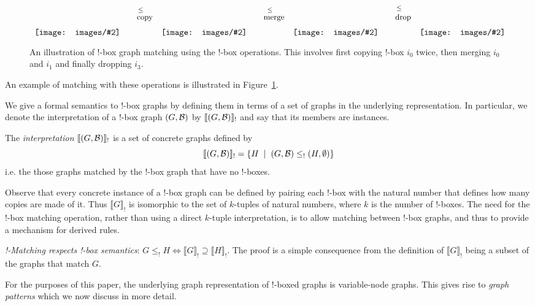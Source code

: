 \documentclass[runningheads]{llncs}
\newcommand{\binterp}[1]{\llbracket #1 \rrbracket_!}
\newcommand{\inlinegraphic}[2]{
  \dimendef\grafheight=255\dimendef\grafvshift=254
  \grafheight=#1
  \grafvshift=-0.5\grafheight
  \advance\grafvshift by 0.5ex
  \raisebox{\grafvshift}{\texttt{[image: images/\#2]}\xspace}
}
\begin{document}
\begin{figure}[t]
$$\begin{array}{ccccccc}
\inlinegraphic{4em}{bbox-ex1} &  
\stackrel{\leq}{\stackrel{\ }{\mbox{\small{copy}}}} 
& \inlinegraphic{4em}{bbox-ex2}  & 
\stackrel{\leq}{\stackrel{\ }{\mbox{\small{merge}}}} 
& \inlinegraphic{4em}{bbox-ex3}  & 
\stackrel{\leq}{\stackrel{\ }{\mbox{\small{drop}}}} 
& \inlinegraphic{4em}{bbox-ex4}
\end{array}$$ 
\label{fig:bang-box-example}\caption{An illustration of !-box graph
  matching using the !-box operations. This involves first copying
  !-box $i_0$ twice, then merging $i_0$ and $i_1$ and finally dropping
  $i_3$.}
\end{figure}
 
An example of matching with these operations is illustrated in
Figure~\ref{fig:bang-box-example}.

We give a formal semantics to !-box graphs by defining them in terms
of a set of graphs in the underlying representation. In particular, we
denote the interpretation of a !-box graph $(G,{\cal B})$ by
$\binterp{(G,{\cal B})}$ and say that its members are instances.

\begin{definition}
  The \emph{interpretation} $\binterp{(G,{\cal B})}$ is a
  set of concrete graphs defined by
  \[
  \binterp{(G,{\cal B})} = \{ H \;\;|\;\; (G,{\cal B}) \leq_! (H,\emptyset) \}
  \]
  i.e. the those graphs matched by the !-box graph that have no
  !-boxes.
\end{definition}

Observe that every concrete instance of a !-box graph can be defined
by pairing each !-box with the natural number that defines how many
copies are made of it. Thus $\binterp{G}$ is isomorphic to the set of
$k$-tuples of natural numbers, where $k$ is the number of !-boxes.
The need for the !-box matching operation, rather than using a direct
$k$-tuple interpretation, is to allow matching between !-box graphs,
and thus to provide a mechanism for derived rules.

\begin{proposition}
\label{thm:bang-box-respect}
\emph{!-Matching respects !-box semantics}: $G \leq_! H
\Leftrightarrow \binterp{G} \supseteq \binterp{H}$. The proof is a
simple consequence from the definition of $\binterp{G}$ being a subset
of the graphs that match $G$.
\end{proposition}

For the purposes of this paper, the underlying graph representation of
!-boxed graphs is variable-node graphs. This gives rise to \emph{graph
patterns} which we now discuss in more detail. 
\end{document}
